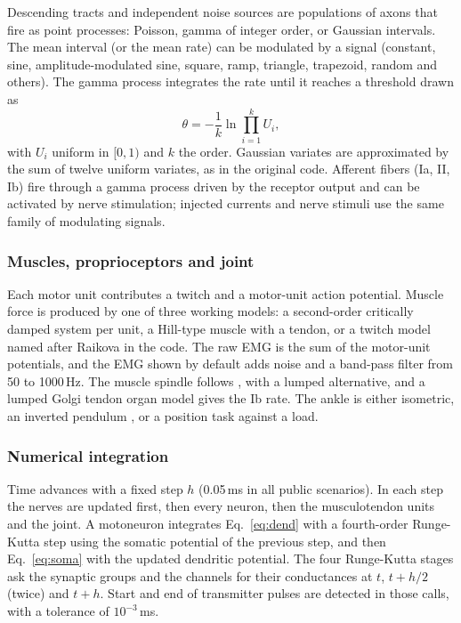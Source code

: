 \documentclass[pdflatex,sn-apa,iicol]{sn-jnl}
\begin{document}
Descending tracts and independent noise sources are populations of axons that fire as point processes: Poisson, gamma of integer order, or Gaussian intervals. The mean interval (or the mean rate) can be modulated by a signal (constant, sine, amplitude-modulated sine, square, ramp, triangle, trapezoid, random and others). The gamma process integrates the rate until it reaches a threshold drawn as
\begin{equation}
\theta = -\frac{1}{k} \ln \prod_{i=1}^{k} U_i , \label{eq:gamma}
\end{equation}
with $U_i$ uniform in $[0, 1)$ and $k$ the order. Gaussian variates are approximated by the sum of twelve uniform variates, as in the original code. Afferent fibers (Ia, II, Ib) fire through a gamma process driven by the receptor output and can be activated by nerve stimulation; injected currents and nerve stimuli use the same family of modulating signals.

\subsubsection{Muscles, proprioceptors and joint}\label{sec:periphery}

Each motor unit contributes a twitch and a motor-unit action potential. Muscle force is produced by one of three working models: a second-order critically damped system per unit, a Hill-type muscle with a tendon, or a twitch model named after Raikova in the code. The raw EMG is the sum of the motor-unit potentials, and the EMG shown by default adds noise and a band-pass filter from 50 to 1000\,Hz. The muscle spindle follows \citet{Mileusnic2006}, with a lumped alternative, and a lumped Golgi tendon organ model gives the Ib rate. The ankle is either isometric, an inverted pendulum \citep{Elias2014}, or a position task against a load.

\subsubsection{Numerical integration}\label{sec:integration}

Time advances with a fixed step $h$ (0.05\,ms in all public scenarios). In each step the nerves are updated first, then every neuron, then the musculotendon units and the joint. A motoneuron integrates Eq.~\eqref{eq:dend} with a fourth-order Runge-Kutta step using the somatic potential of the previous step, and then Eq.~\eqref{eq:soma} with the updated dendritic potential. The four Runge-Kutta stages ask the synaptic groups and the channels for their conductances at $t$, $t + h/2$ (twice) and $t + h$. Start and end of transmitter pulses are detected in those calls, with a tolerance of $10^{-3}$\,ms.
\end{document}
